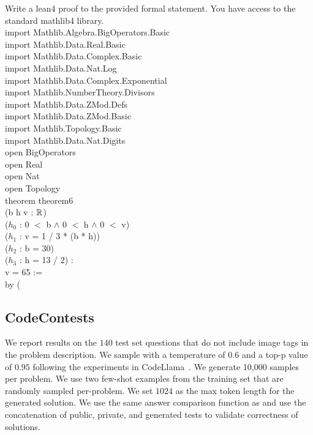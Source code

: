 \documentclass[11pt]{article}
\begin{document}
\begin{tcolorbox}[
    colback=gray!5,
    colframe=gray!75,
    title=Example Prompt,
    fonttitle=\bfseries
]
Write a lean4 proof to the provided formal statement. You have access to the standard mathlib4 library.\\
\textasciigrave \textasciigrave \textasciigrave import Mathlib.Algebra.BigOperators.Basic\\
import Mathlib.Data.Real.Basic\\
import Mathlib.Data.Complex.Basic\\
import Mathlib.Data.Nat.Log\\
import Mathlib.Data.Complex.Exponential\\
import Mathlib.NumberTheory.Divisors\\
import Mathlib.Data.ZMod.Defs\\
import Mathlib.Data.ZMod.Basic\\
import Mathlib.Topology.Basic\\
import Mathlib.Data.Nat.Digits\\

open BigOperators\\
open Real\\
open Nat\\
open Topology\\
theorem theorem6\\
  (b h v : $\mathbb{R}$)\\
  ($h_0$ : 0 $<$ b $\wedge$ 0 $<$ h $\wedge$ 0 $<$ v)\\
  ($h_1$ : v = 1 / 3 * (b * h))\\
  ($h_2$ : b = 30)\\
  ($h_3$ : h = 13 / 2) :\\
  v = 65 :=\\
by (\\

\end{tcolorbox}

\subsection{CodeContests}

We report results on the $140$ test set questions that do not include image tags in the problem description. We sample with a temperature of $0.6$ and a top-p value of $0.95$ following the experiments in CodeLlama~\cite{rozière2023codellamaopenfoundation}. We generate 10,000 samples per problem. We use two few-shot examples from the training set that are randomly sampled per-problem. We set $1024$ as the max token length for the generated solution. We use the same answer comparison function as \cite{Li_2022} and use the concatenation of public, private, and generated tests to validate correctness of solutions.
\end{document}
